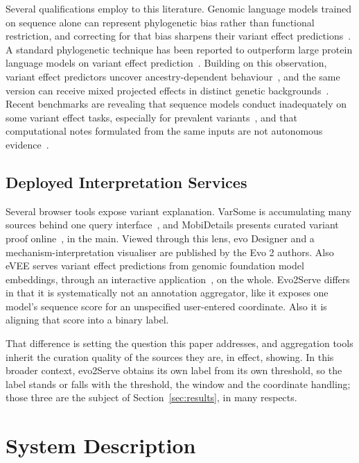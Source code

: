 \documentclass[10pt,journal]{IEEEtran}
\begin{document}
Several qualifications employ to this literature. Genomic language models trained on sequence alone can represent phylogenetic bias rather than functional restriction, and correcting for that bias sharpens their variant effect predictions~\cite{pugh2025likelihood}. A standard phylogenetic technique has been reported to outperform large protein language models on variant effect prediction~\cite{prillo2024siterm}. Building on this observation, variant effect predictors uncover ancestry-dependent behaviour~\cite{pathak2024ancestry}, and the same version can receive mixed projected effects in distinct genetic backgrounds~\cite{rastogi2025critical}. Recent benchmarks are revealing that sequence models conduct inadequately on some variant effect tasks, especially for prevalent variants~\cite{hosseini2025motifdiff}, and that computational notes formulated from the same inputs are not autonomous evidence~\cite{richards2015acmg}.

\subsection{Deployed Interpretation Services}
Several browser tools expose variant explanation. VarSome is accumulating many sources behind one query interface~\cite{vandenbroucke2019varsome}, and MobiDetails presents curated variant proof online~\cite{baux2021mobidetails}, in the main. Viewed through this lens, evo Designer and a mechanism-interpretation visualiser are published by the Evo 2 authors. Also eVEE serves variant effect predictions from genomic foundation model embeddings, through an interactive application~\cite{pearce2026evee,brandes2023esm1b}, on the whole. Evo2Serve differs in that it is systematically not an annotation aggregator, like it exposes one model's sequence score for an unspecified user-entered coordinate. Also it is aligning that score into a binary label.

That difference is setting the question this paper addresses, and aggregation tools inherit the curation quality of the sources they are, in effect, showing. In this broader context, evo2Serve obtains its own label from its own threshold, so the label stands or falls with the threshold, the window and the coordinate handling; those three are the subject of Section~\ref{sec:results}, in many respects.

\section{System Description}
\label{sec:system}
\end{document}
